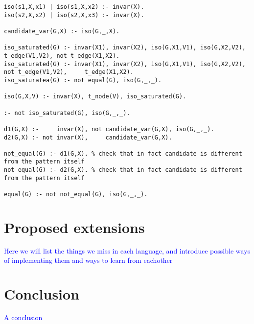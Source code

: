 \documentclass{article}
\theoremstyle{definition}
\newcommand{\matthias}[1]{\textcolor{blue}{\marginpar{\sc Matthias} #1}}
\begin{document}
\begin{lstlisting}[caption=Canonicity previous solution isomorphism check, style=model]
iso(s1,X,x1) | iso(s1,X,x2) :- invar(X).
iso(s2,X,x2) | iso(s2,X,x3) :- invar(X).

candidate_var(G,X) :- iso(G,_,X).

iso_saturated(G) :- invar(X1), invar(X2), iso(G,X1,V1), iso(G,X2,V2),     t_edge(V1,V2), not t_edge(X1,X2). 
iso_saturated(G) :- invar(X1), invar(X2), iso(G,X1,V1), iso(G,X2,V2), not t_edge(V1,V2),     t_edge(X1,X2). 
iso_saturatea(G) :- not equal(G), iso(G,_,_). 

iso(G,X,V) :- invar(X), t_node(V), iso_saturated(G).

:- not iso_saturated(G), iso(G,_,_).

d1(G,X) :-     invar(X), not candidate_var(G,X), iso(G,_,_).
d2(G,X) :- not invar(X),     candidate_var(G,X).

not_equal(G) :- d1(G,X). % check that in fact candidate is different from the pattern itself
not_equal(G) :- d2(G,X). % check that in fact candidate is different from the pattern itself

equal(G) :- not not_equal(G), iso(G,_,_).
\end{lstlisting}

\section{Proposed extensions}
\matthias{Here we will list the things we miss in each language, and introduce possible ways of implementing them and ways to learn from eachother}

\section{Conclusion}
\matthias{A conclusion}



\end{document}
